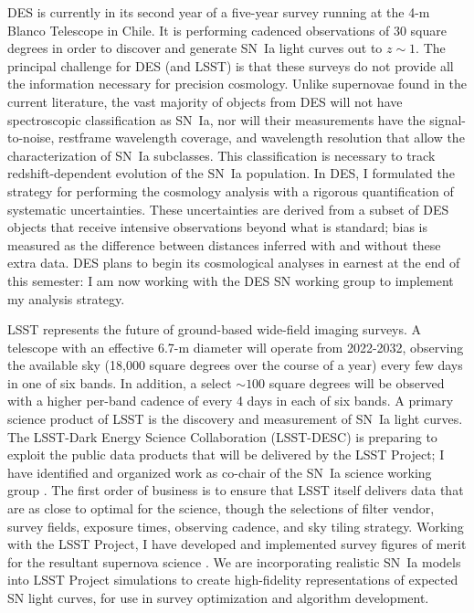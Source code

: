 \documentclass{article}
\begin{document}
DES is currently in its second year of a five-year survey running at the 4-m Blanco Telescope in Chile.  It is performing
cadenced observations of 30 square degrees in order to discover and generate SN~Ia light curves out
to $z\sim1$.
The principal challenge for DES (and LSST) is that these surveys do
not provide all the information necessary for precision cosmology.
Unlike  supernovae found in the current literature, the vast majority of objects from DES
will not have spectroscopic classification as SN~Ia, nor will their
measurements have the signal-to-noise, restframe wavelength coverage, and wavelength resolution that allow 
the characterization of SN~Ia subclasses.  This classification is necessary to track redshift-dependent evolution of 
the SN~Ia population.  In DES, I  formulated the strategy for performing the cosmology analysis
with a rigorous quantification of systematic uncertainties.  These uncertainties are  derived from a subset of 
DES objects that receive intensive observations beyond what is standard;
bias is measured as the difference between distances inferred with
and without these extra data. 
DES plans to begin its cosmological analyses in earnest at the end
of this semester: I am now  working with the DES SN working group to implement my analysis strategy.

LSST  represents the future of ground-based wide-field imaging surveys.
A telescope with an effective 6.7-m diameter will operate from 2022-2032, observing the available sky (18,000 square degrees over the course
of a year)
every few days in one of six bands.  In addition, a select $\sim 100$ square degrees will be observed with a higher per-band
cadence of every 4 days
in each of six bands.
A primary science product of LSST is the discovery and measurement of SN~Ia light curves.
The LSST-Dark Energy Science Collaboration (LSST-DESC) is preparing
to exploit  the public data products that will be
delivered by the  LSST Project;  I have identified and organized
work as co-chair of the SN~Ia science working group \cite{2012arXiv1211.0310L}.
The first order of business is to ensure that LSST itself delivers data that are as close to optimal for the science, though
the selections of filter vendor, survey fields, exposure times, observing cadence, and sky tiling strategy.
Working with the LSST Project\iftoggle{UW}{ (including UW colleagues)}{},
I have developed and implemented survey figures of merit for the resultant supernova science
\cite{LSSTCadence}.  
We are incorporating realistic SN~Ia models  into LSST Project simulations to create high-fidelity representations
of expected SN light curves, for use in survey optimization and algorithm development.
\iftoggle{UW}{Progress on this ongoing work will be
facilitated by my being co-located with key players in the LSST Project.}{}
\end{document}
